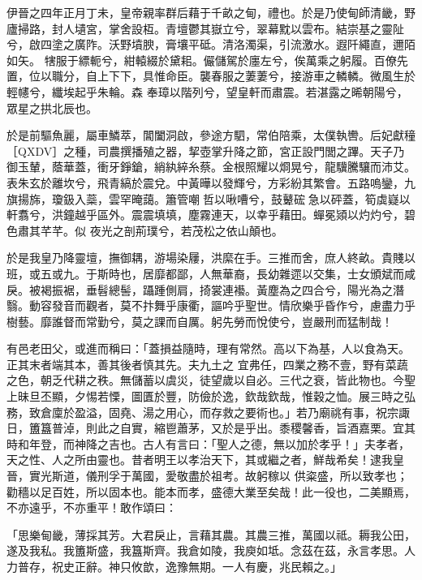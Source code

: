 \begin{pinyinscope}
伊晉之四年正月丁未，皇帝親率群后藉于千畝之甸，禮也。於是乃使甸師清畿，野廬掃路，封人壝宮，掌舍設枑。青壇鬱其嶽立兮，翠幕黕以雲布。結崇基之靈阯兮，啟四塗之廣阼。沃野墳腴，膏壤平砥。清洛濁渠，引流激水。遐阡繩直，邇陌如矢。
 犗服于縹軛兮，紺轅綴於黛耜。儼儲駕於廛左兮，俟萬乘之躬履。百僚先置，位以職分，自上下下，具惟命臣。襲春服之萋萋兮，接游車之轔轔。微風生於輕幰兮，纖埃起乎朱輪。森
 奉璋以階列兮，望皇軒而肅震。若湛露之晞朝陽兮，眾星之拱北辰也。



 於是前驅魚麗，屬車鱗萃，閶闔洞啟，參途方駟，常伯陪乘，太僕執轡。后妃獻穜［QXDV］之種，司農撰播殖之器，挈壺掌升降之節，宮正設門閭之蹕。天子乃御玉輦，蔭華蓋，衝牙錚鎗，綃紈綷糸蔡。金根照耀以烱晃兮，龍驥騰驤而沛艾。表朱玄於離坎兮，飛青縞於震兌。中黃曄以發輝兮，方彩紛其繁會。五路嗚鑾，九旗揚旆，瓊鈒入蘂，雲罕晻藹。簫管嘲哲以啾嘈兮，鼓鼙硡急以砰蓋，筍虡嶷以軒翥兮，洪鐘越乎區外。震震填填，塵霧連天，以幸乎藉田。蟬冕熲以灼灼兮，碧色肅其芊芊。似
 夜光之剖荊璞兮，若茂松之依山顛也。



 於是我皇乃降靈壇，撫御耦，游場染屨，洪縻在手。三推而舍，庶人終畝。貴賤以班，或五或九。于斯時也，居靡都鄙，人無華裔，長幼雜遝以交集，士女頒斌而咸戾。被褐振裾，垂髫總髻，躡踵側肩，掎裳連襼。黃塵為之四合兮，陽光為之潛翳。動容發音而觀者，莫不抃舞乎康衢，謳吟乎聖世。情欣樂乎昏作兮，慮盡力乎樹藝。靡誰督而常勤兮，莫之課而自厲。躬先勞而悅使兮，豈嚴刑而猛制哉！



 有邑老田父，或進而稱曰：「蓋損益隨時，理有常然。高以下為基，人以食為天。正其末者端其本，善其後者慎其先。夫九土之
 宜弗任，四業之務不壹，野有菜蔬之色，朝乏代耕之秩。無儲蓄以虞災，徒望歲以自必。三代之衰，皆此物也。今聖上昧旦丕顯，夕惕若慄，圖匱於豐，防儉於逸，欽哉欽哉，惟穀之恤。展三時之弘務，致倉廩於盈溢，固堯、湯之用心，而存救之要術也。」若乃廟祧有事，祝宗諏日，簠簋普淖，則此之自實，縮鬯蕭茅，又於是乎出。黍稷馨香，旨酒嘉栗。宜其時和年登，而神降之吉也。古人有言曰：「聖人之德，無以加於孝乎！」夫孝者，天之性、人之所由靈也。昔者明王以孝治天下，其或繼之者，鮮哉希矣！逮我皇晉，實光斯道，儀刑孚于萬國，愛敬盡於祖考。故躬稼以
 供粢盛，所以致孝也；勸穡以足百姓，所以固本也。能本而孝，盛德大業至矣哉！此一役也，二美顯焉，不亦遠乎，不亦重平！敢作頌曰：



 「思樂甸畿，薄採其芳。大君戾止，言藉其農。其農三推，萬國以祗。耨我公田，遂及我私。我簠斯盛，我簋斯齊。我倉如陵，我庾如坻。念茲在茲，永言孝思。人力普存，祝史正辭。神只攸歆，逸豫無期。一人有慶，兆民賴之。」




\end{pinyinscope}
